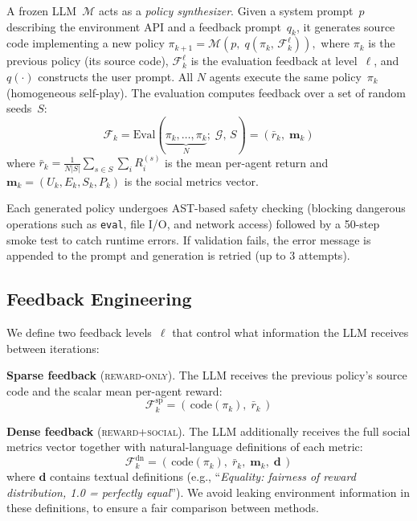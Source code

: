\documentclass{nextgame2026} %
\newcommand{\Mllm}{\mathcal{M}}
\begin{document}
A frozen LLM~$\Mllm$ acts as a \emph{policy synthesizer}.  Given a system
prompt~$p$ describing the environment API and a feedback
prompt~$q_k$, it generates source code implementing a new policy
$
  \pi_{k+1} = \Mllm\!\left(p,\; q\!\left(\pi_k,\,\mathcal{F}_k^\ell\right)\right),
$
where $\pi_k$ is the previous policy (its source code),
$\mathcal{F}_k^\ell$ is the evaluation feedback at level~$\ell$, and
$q(\cdot)$ constructs the user prompt.
All $N$ agents execute the same policy~$\pi_k$ (homogeneous self-play).
The evaluation computes feedback over a set of random seeds~$S$:
\begin{equation*}
  \mathcal{F}_k = \mathrm{Eval}(\underbrace{\pi_k, \ldots,\pi_k}_{N};\;\mathcal{G},\,S)
  = \left(\bar{r}_k,\;\mathbf{m}_k\right)
  \label{eq:eval}
\end{equation*}
where $\bar{r}_k = \frac{1}{N|S|}\sum_{s \in S}\sum_i R_i^{(s)}$ is
the mean per-agent return and $\mathbf{m}_k = (U_k, E_k, S_k, P_k)$ is the
social metrics vector.


Each generated policy undergoes AST-based safety checking
(blocking dangerous operations such as \texttt{eval}, file I/O,
and network access) followed by a 50-step smoke test
to catch runtime errors.  If validation fails, the error message is
appended to the prompt and generation is retried (up to 3 attempts).



\subsection{Feedback Engineering}
\label{sec:feedback}

We define two feedback levels~$\ell$ that control what information the LLM
receives between iterations:

\textbf{Sparse feedback} (\textsc{reward-only}).  The LLM receives the
previous policy's source code and the scalar mean per-agent reward:
\begin{equation}
  \mathcal{F}_k^{\mathrm{sp}} = \left(\,\mathrm{code}(\pi_k),\;\bar{r}_k\,\right)
  \label{eq:sparse}
\end{equation}

\textbf{Dense feedback} (\textsc{reward+social}).  The LLM additionally
receives the full social metrics vector together with natural-language
definitions of each metric:
\begin{equation}
  \mathcal{F}_k^{\mathrm{dn}} = \left(\,\mathrm{code}(\pi_k),\;\bar{r}_k,\;\mathbf{m}_k,\;\mathbf{d}\,\right)
  \label{eq:dense}
\end{equation}
where $\mathbf{d}$ contains textual definitions
(e.g., ``\emph{Equality: fairness of reward distribution, 1.0 =
perfectly equal}''). We avoid leaking environment information in these definitions, to ensure a fair comparison between methods.
\end{document}
